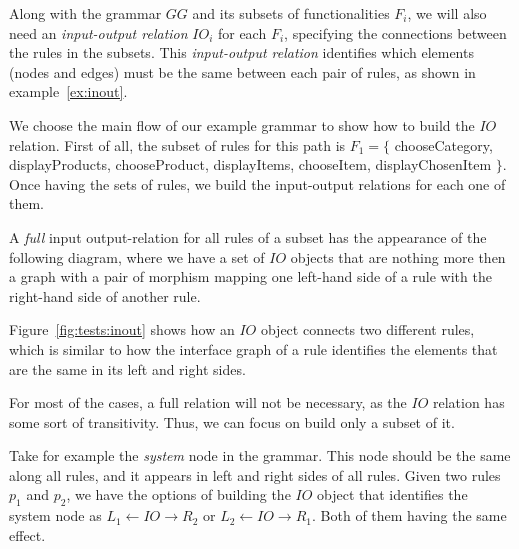 
Along with the grammar $GG$ and its subsets of functionalities $F_i$, we will also need an \emph{input-output relation} $IO_i$ for each $F_i$, specifying the connections between the rules in the subsets. This \emph{input-output relation} identifies which elements (nodes and edges) must be the same between each pair of rules, as shown in example~\ref{ex:inout}.

  We choose the main flow of our example grammar to show how to build the $IO$ relation. First of all, the subset of rules for this path is $F_1 = \{$ chooseCategory, displayProducts, chooseProduct, displayItems, chooseItem, displayChosenItem $\}$. Once having the sets of rules, we build the input-output relations for each one of them.

\begin{example}\label{ex:inout} A \emph{full} input output-relation for all rules of a subset has the appearance of the following diagram, where we have a set of $IO$ objects that are nothing more then a graph with a pair of morphism mapping one left-hand side of a rule with the right-hand side of another rule.

    Figure~\ref{fig:tests:inout} shows how an $IO$ object connects two different rules, which is similar to how the interface graph of a rule identifies the elements that are the same in its left and right sides.

\hfill\break

  For most of the cases, a full relation will not be necessary, as the $IO$ relation has some sort of transitivity. Thus, we can focus on build only a subset of it. 
  
  Take for example the \emph{system} node in the grammar. This node should be the same along all rules, and it appears in left and right sides of all rules. Given two rules $p_1$ and $p_2$, we have the options of building the $IO$ object that identifies the system node as $L_1 \leftarrow IO \rightarrow R_2$ or $L_2 \leftarrow IO \rightarrow R_1$. Both of them having the same effect.


\end{example}
